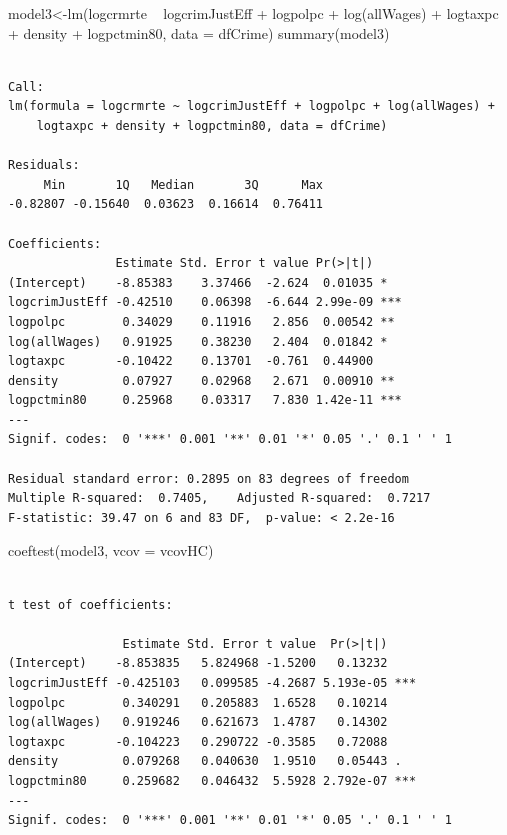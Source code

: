 \documentclass[]{article}
\newenvironment{Shaded}{}{}
\newcommand{\DataTypeTok}[1]{#1}
\newcommand{\KeywordTok}[1]{\textcolor[rgb]{0.00,0.00,1.00}{#1}}
\newcommand{\NormalTok}[1]{#1}
\newcommand{\OperatorTok}[1]{#1}
\newcommand{\StringTok}[1]{\textcolor[rgb]{0.00,0.50,0.50}{#1}}
\begin{document}
\begin{Shaded}
\begin{Highlighting}[]
\NormalTok{model3<-}\KeywordTok{lm}\NormalTok{(logcrmrte }\OperatorTok{~}\StringTok{ }\NormalTok{logcrimJustEff }\OperatorTok{+}\StringTok{ }\NormalTok{logpolpc }\OperatorTok{+}\StringTok{ }\KeywordTok{log}\NormalTok{(allWages) }\OperatorTok{+}\StringTok{ }\NormalTok{logtaxpc }\OperatorTok{+}\StringTok{ }\NormalTok{density }\OperatorTok{+}
\StringTok{             }\NormalTok{logpctmin80, }\DataTypeTok{data =}\NormalTok{ dfCrime)}
\KeywordTok{summary}\NormalTok{(model3)}
\end{Highlighting}
\end{Shaded}

\begin{verbatim}

Call:
lm(formula = logcrmrte ~ logcrimJustEff + logpolpc + log(allWages) + 
    logtaxpc + density + logpctmin80, data = dfCrime)

Residuals:
     Min       1Q   Median       3Q      Max 
-0.82807 -0.15640  0.03623  0.16614  0.76411 

Coefficients:
               Estimate Std. Error t value Pr(>|t|)    
(Intercept)    -8.85383    3.37466  -2.624  0.01035 *  
logcrimJustEff -0.42510    0.06398  -6.644 2.99e-09 ***
logpolpc        0.34029    0.11916   2.856  0.00542 ** 
log(allWages)   0.91925    0.38230   2.404  0.01842 *  
logtaxpc       -0.10422    0.13701  -0.761  0.44900    
density         0.07927    0.02968   2.671  0.00910 ** 
logpctmin80     0.25968    0.03317   7.830 1.42e-11 ***
---
Signif. codes:  0 '***' 0.001 '**' 0.01 '*' 0.05 '.' 0.1 ' ' 1

Residual standard error: 0.2895 on 83 degrees of freedom
Multiple R-squared:  0.7405,    Adjusted R-squared:  0.7217 
F-statistic: 39.47 on 6 and 83 DF,  p-value: < 2.2e-16
\end{verbatim}

\begin{Shaded}
\begin{Highlighting}[]
\KeywordTok{coeftest}\NormalTok{(model3, }\DataTypeTok{vcov =}\NormalTok{ vcovHC)}
\end{Highlighting}
\end{Shaded}

\begin{verbatim}

t test of coefficients:

                Estimate Std. Error t value  Pr(>|t|)    
(Intercept)    -8.853835   5.824968 -1.5200   0.13232    
logcrimJustEff -0.425103   0.099585 -4.2687 5.193e-05 ***
logpolpc        0.340291   0.205883  1.6528   0.10214    
log(allWages)   0.919246   0.621673  1.4787   0.14302    
logtaxpc       -0.104223   0.290722 -0.3585   0.72088    
density         0.079268   0.040630  1.9510   0.05443 .  
logpctmin80     0.259682   0.046432  5.5928 2.792e-07 ***
---
Signif. codes:  0 '***' 0.001 '**' 0.01 '*' 0.05 '.' 0.1 ' ' 1
\end{verbatim}
\end{document}
